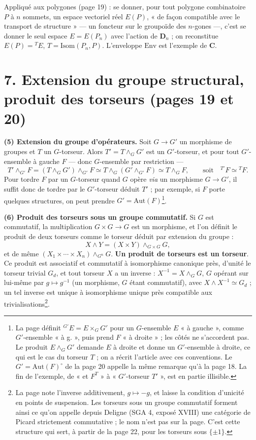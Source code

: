 \documentclass[11pt,a4paper]{article}
\begin{document}
Appliqué aux polygones (page 19) : se donner, pour tout polygone
combinatoire $P$ à $n$ sommets, un espace vectoriel réel $E(P)$, « de façon
compatible avec le transport de structure » --- un foncteur sur le groupoïde
des $n$-gones ---, c'est se donner le seul espace $E = E(P_n)$ avec l'action
de $\mathbf{D}_n$ ; on reconstitue $E(P) = {}^{T}E$, $T = \mathrm{Isom}(P_n,
P)$. L'enveloppe $\mathrm{Env}$ est l'exemple de $\mathbf{C}$.

\section*{7. Extension du groupe structural, produit des torseurs (pages 19 et 20)}

\textbf{(5) Extension du groupe d'opérateurs.} Soit $G \to G'$ un morphisme
de groupes et $T$ un $G$-torseur. Alors $T' = T \wedge_G G'$ est un
$G'$-torseur, et pour tout $G'$-ensemble à gauche $F$ --- donc $G$-ensemble par
restriction ---
\[
  T' \wedge_{G'} F = (T \wedge_G G') \wedge_{G'} F \simeq T \wedge_G (G'
  \wedge_{G'} F) \simeq T \wedge_G F, \qquad\text{soit}\quad {}^{T'}F \simeq {}^{T}F .
\]
Pour tordre $F$ par un $G$-torseur quand $G$ opère \emph{via} un morphisme $G
\to G'$, il suffit donc de tordre par le $G'$-torseur déduit $T'$ ; par
exemple, si $F$ porte quelques structures, on peut prendre $G' =
\mathrm{Aut}(F)$\footnote{La page définit ${}^{G'}E = E \times_G G'$ pour un
$G$-ensemble $E$ « à gauche », comme $G'$-ensemble « à g. », puis prend $F$
« à droite » ; les côtés ne s'accordent pas. Le produit $E \wedge_G G'$
demande $E$ à droite et donne un $G'$-ensemble à droite, ce qui est le cas
du torseur $T$ ; on a récrit l'article avec ces conventions. Le $G' =
\mathrm{Aut}(F)^{\circ}$ de la page 20 appelle la même remarque qu'à la
page 18. La fin de l'exemple, de « et $F^{T}$ » à « $G'$-torseur $T'$ », est
en partie illisible.}.

\textbf{(6) Produit des torseurs sous un groupe commutatif.} Si $G$ est
commutatif, la multiplication $G \times G \to G$ est un morphisme, et l'on
définit le produit de deux torseurs comme le torseur déduit par extension du
groupe :
\[
  X \wedge Y = (X \times Y) \wedge_{G \times G} G,
\]
et de même $(X_1 \times \cdots \times X_n) \wedge_{G^n} G$. \textbf{Un produit
de torseurs est un torseur}. Ce produit est associatif et commutatif à
isomorphisme canonique près, d'unité le torseur trivial $G_d$, et tout torseur
$X$ a un inverse : $X^{-1} = X \wedge_G G$, $G$ opérant sur lui-même par
$g \mapsto g^{-1}$ (un morphisme, $G$ étant commutatif), avec $X \wedge X^{-1}
\simeq G_d$ ; un tel inverse est unique à isomorphisme unique près compatible
aux trivialisations\footnote{La page note l'inverse additivement, $g \mapsto
-g$, et laisse la condition d'unicité en points de suspension. Les torseurs
sous un groupe commutatif forment ainsi ce qu'on appelle depuis Deligne
(SGA 4, exposé XVIII) une catégorie de Picard strictement commutative ; le
nom n'est pas sur la page. C'est cette structure qui sert, à partir de la
page 22, pour les torseurs sous $\{\pm 1\}$.}.
\end{document}
